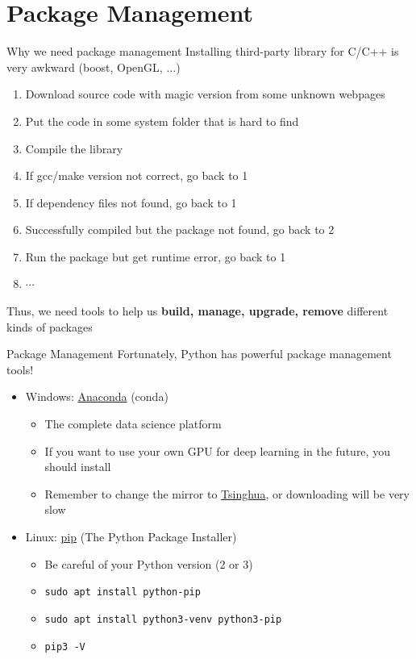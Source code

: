 \documentclass{../TexTemplate/myslide}
\begin{document}
\section{Package Management}
\begin{frame}
\sectionpage
\end{frame}

\begin{frame}{Why we need package management}
Installing third-party library for C/C++ is very awkward (boost, OpenGL, $\ldots$)
\begin{enumerate}
	\item Download source code with magic version from some unknown webpages
	\item Put the code in some system folder that is hard to find
	\item Compile the library
	\item If gcc/make version not correct, go back to 1
	\item If dependency files not found, go back to 1
	\item Successfully compiled but the package not found, go back to 2
	\item Run the package but get runtime error, go back to 1
	\item $\cdots$
\end{enumerate}
\pause
Thus, we need tools to help us \textbf{build, manage, upgrade, remove} different kinds of packages
\end{frame}

\begin{frame}[fragile]{Package Management}
Fortunately, Python has powerful package management tools!
\begin{itemize}
	\item Windows: \href{https://www.anaconda.com/}{Anaconda} (conda)
	\begin{itemize}
		\item The complete data science platform
		\item If you want to use your own GPU for deep learning in the future, you should install
		\item Remember to change the mirror to \href{https://mirror.tuna.tsinghua.edu.cn/help/anaconda/}{Tsinghua}, or downloading will be very slow
	\end{itemize}
	\item Linux: \href{https://pip.pypa.io/en/stable/}{pip} (The Python Package Installer)
	\begin{itemize}
		\item Be careful of your Python version (2 or 3)
		\item \verb'sudo apt install python-pip'
		\item \verb'sudo apt install python3-venv python3-pip'
		\item \verb'pip3 -V'
	\end{itemize}
\end{itemize}
\end{frame}
\end{document}
